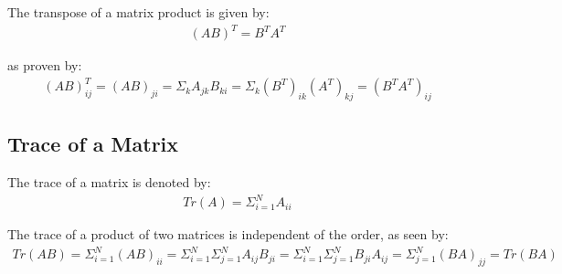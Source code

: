 \documentclass{article}
\begin{document}
The transpose of a matrix product is given by:
\begin{align}
	(AB)^T = B^T A^T
\end{align}

as proven by:
\begin{align}
	(AB)_{ij}^T = (AB)_{ji} = \Sigma_k A_{jk} B_{ki} = \Sigma_k (B^T)_{ik} (A^T)_{kj} = (B^T A^T)_{ij}
\end{align}

\subsection{Trace of a Matrix}

The trace of a matrix is denoted by:
\begin{align}
	Tr(A) = \Sigma_{i=1}^N A_{ii}
\end{align}

The trace of a product of two matrices is independent of the order, as seen by:
\begin{align}
	Tr(AB) = \Sigma_{i=1}^N (AB)_{ii} = \Sigma_{i=1}^N \Sigma_{j=1}^N A_{ij} B_{ji} = \Sigma_{i=1}^N \Sigma_{j=1}^N B_{ji} A_{ij} = \Sigma_{j=1}^N (BA)_{jj} = Tr(BA)
\end{align}
\end{document}
